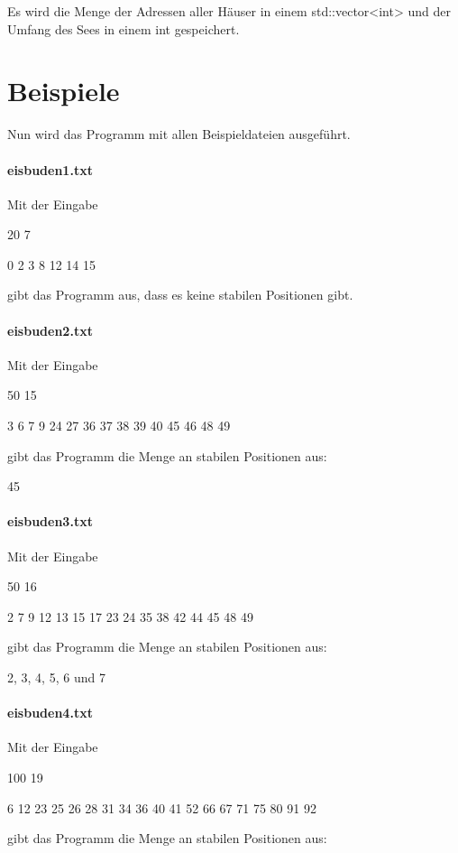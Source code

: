 \documentclass[a4paper,10pt,ngerman]{scrartcl}
\begin{document}
Es wird die Menge der Adressen aller Häuser in einem std::vector<int> und der Umfang des Sees in einem int gespeichert.


\section{Beispiele}
Nun wird das Programm mit allen Beispieldateien ausgeführt.

\paragraph{eisbuden1.txt}
Mit der Eingabe

20 7

0 2 3 8 12 14 15

gibt das Programm aus, dass es keine stabilen Positionen gibt.

\paragraph{eisbuden2.txt}
Mit der Eingabe

50 15

3 6 7 9 24 27 36 37 38 39 40 45 46 48 49

gibt das Programm die Menge an stabilen Positionen aus:

45

\paragraph{eisbuden3.txt}
Mit der Eingabe

50 16

2 7 9 12 13 15 17 23 24 35 38 42 44 45 48 49

gibt das Programm die Menge an stabilen Positionen aus:

2, 3, 4, 5, 6 und 7

\paragraph{eisbuden4.txt}
Mit der Eingabe

100 19

6 12 23 25 26 28 31 34 36 40 41 52 66 67 71 75 80 91 92

gibt das Programm die Menge an stabilen Positionen aus:
\end{document}
